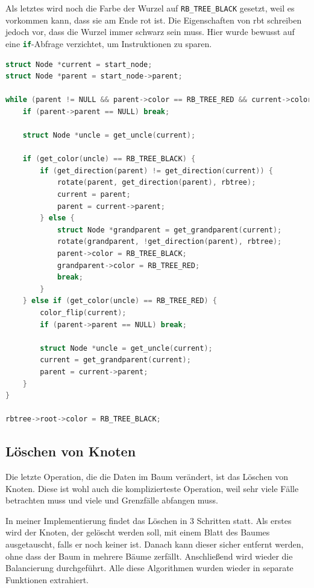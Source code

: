 \documentclass[11pt]{article}
\newcommand{\lstin}[1]{\lstinline[language=C]{#1}}
\begin{document}
Als letztes wird noch die Farbe der Wurzel auf \lstin{RB_TREE_BLACK} gesetzt, weil es vorkommen kann,
dass sie am Ende rot ist. Die Eigenschaften von \gls{rbt} schreiben jedoch vor, dass die Wurzel immer schwarz sein muss.
Hier wurde bewusst auf eine \lstin{if}-Abfrage verzichtet, um Instruktionen zu sparen.

\begin{lstlisting}[language=C]
struct Node *current = start_node;
struct Node *parent = start_node->parent;

while (parent != NULL && parent->color == RB_TREE_RED && current->color == RB_TREE_RED) {
    if (parent->parent == NULL) break;

    struct Node *uncle = get_uncle(current);

    if (get_color(uncle) == RB_TREE_BLACK) {
        if (get_direction(parent) != get_direction(current)) {
            rotate(parent, get_direction(parent), rbtree);
            current = parent;
            parent = current->parent;
        } else {
            struct Node *grandparent = get_grandparent(current);
            rotate(grandparent, !get_direction(parent), rbtree);
            parent->color = RB_TREE_BLACK;
            grandparent->color = RB_TREE_RED;
            break;
        }
    } else if (get_color(uncle) == RB_TREE_RED) {
        color_flip(current);
        if (parent->parent == NULL) break;

        struct Node *uncle = get_uncle(current);
        current = get_grandparent(current);
        parent = current->parent;
    }
}

rbtree->root->color = RB_TREE_BLACK;

\end{lstlisting}

\subsection{Löschen von Knoten}

Die letzte Operation, die die Daten im Baum verändert, ist das Löschen von Knoten.
Diese ist wohl auch die komplizierteste Operation, weil sehr viele Fälle betrachten
muss und viele und Grenzfälle abfangen muss.

In meiner Implementierung findet das Löschen in 3 Schritten statt. Als erstes wird der Knoten, der gelöscht werden soll,
mit einem Blatt des Baumes ausgetauscht, falls er noch keiner ist. Danach kann dieser sicher entfernt werden, ohne dass der Baum
in mehrere Bäume zerfällt. Anschließend wird wieder die Balancierung durchgeführt.
Alle diese Algorithmen wurden wieder in separate Funktionen extrahiert.
\end{document}
